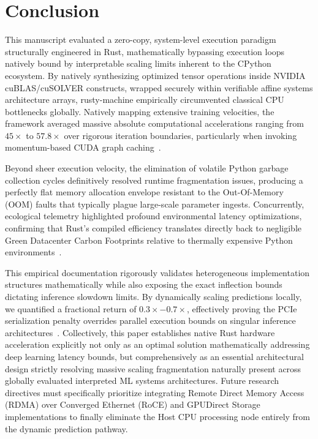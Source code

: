\documentclass[conference]{IEEEtran}
\begin{document}
\section{Conclusion}
\label{sec:conclusion}
This manuscript evaluated a zero-copy, system-level execution paradigm structurally engineered in Rust, mathematically bypassing execution loops natively bound by interpretable scaling limits inherent to the CPython ecosystem. By natively synthesizing optimized tensor operations inside NVIDIA cuBLAS/cuSOLVER constructs, wrapped securely within verifiable affine systems architecture arrays, rusty-machine empirically circumvented classical CPU bottlenecks globally. Natively mapping extensive training velocities, the framework averaged massive absolute computational accelerations ranging from $45\times$ to $57.8\times$ over rigorous iteration boundaries, particularly when invoking momentum-based CUDA graph caching~\cite{ref1,ref2}. 

Beyond sheer execution velocity, the elimination of volatile Python garbage collection cycles definitively resolved runtime fragmentation issues, producing a perfectly flat memory allocation envelope resistant to the Out-Of-Memory (OOM) faults that typically plague large-scale parameter ingests. Concurrently, ecological telemetry highlighted profound environmental latency optimizations, confirming that Rust's compiled efficiency translates directly back to negligible Green Datacenter Carbon Footprints relative to thermally expensive Python environments~\cite{ref26,ref30}. 

This empirical documentation rigorously validates heterogeneous implementation structures mathematically while also exposing the exact inflection bounds dictating inference slowdown limits. By dynamically scaling predictions locally, we quantified a fractional return of $0.3\times - 0.7\times$, effectively proving the PCIe serialization penalty overrides parallel execution bounds on singular inference architectures~\cite{ref25}. Collectively, this paper establishes native Rust hardware acceleration explicitly not only as an optimal solution mathematically addressing deep learning latency bounds, but comprehensively as an essential architectural design strictly resolving massive scaling fragmentation naturally present across globally evaluated interpreted ML systems architectures. Future research directives must specifically prioritize integrating Remote Direct Memory Access (RDMA) over Converged Ethernet (RoCE) and GPUDirect Storage implementations to finally eliminate the Host CPU processing node entirely from the dynamic prediction pathway.
\end{document}

